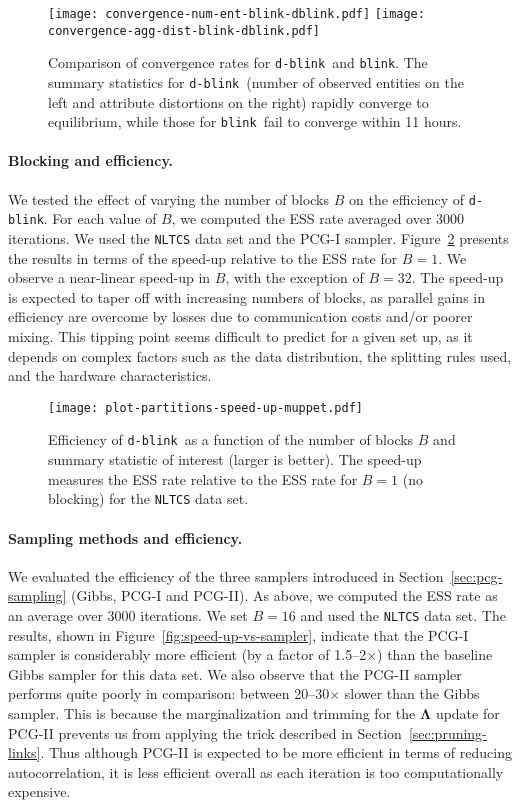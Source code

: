 \documentclass[12pt,letterpaper]{article}
\renewcommand\vec{\bm}
\newcommand{\1}[1]{\mathbb{I}\!\left[#1\right]} %
\newcommand{\dblink}{\texttt{\upshape \lowercase{d-blink}}} %
\newcommand{\blink}{\texttt{\upshape \lowercase{blink}}} %
\begin{document}
\begin{figure}[t]
  \centering
  \texttt{[image: convergence-num-ent-blink-dblink.pdf]} \quad
  \texttt{[image: convergence-agg-dist-blink-dblink.pdf]}
  \caption{Comparison of convergence rates for \dblink\ and 
  \blink. 
  The summary statistics for \dblink\ (number of observed entities 
  on the left and attribute distortions on the right) rapidly converge 
  to equilibrium, 
  while those for \blink\ fail to converge within 11 hours.}
  \label{fig:convergence-vs-impl}
\end{figure}

\paragraph{Blocking and efficiency.}
We tested the effect of varying the number of blocks $B$ on the efficiency 
of \dblink.
For each value of $B$, we computed the ESS rate 
averaged over 3000 iterations.
We used the \texttt{NLTCS} data set and the PCG-I sampler.
Figure~\ref{fig:speed-up-vs-num-partitions} presents the results in terms of 
the speed-up relative to the ESS rate for $B = 1$. 
We observe a near-linear speed-up in $B$, with the exception of $B=32$.
The speed-up is expected to taper off with increasing numbers of blocks, 
as parallel gains in efficiency are overcome by losses due to communication 
costs and\slash or poorer mixing.
This tipping point seems difficult to predict for a given set up, as it 
depends on complex factors such as the data distribution, the splitting rules 
used, and the hardware characteristics.

\begin{figure}[t]
  \centering
  \texttt{[image: plot-partitions-speed-up-muppet.pdf]}
  \caption{Efficiency of \dblink\ as a function of the
    number of blocks $B$ and summary statistic of interest 
    (larger is better).
    The speed-up measures the ESS rate relative to the ESS rate 
    for $B = 1$ (no blocking) for the \texttt{NLTCS} data set.}
  \label{fig:speed-up-vs-num-partitions}
\end{figure}

\paragraph{Sampling methods and efficiency.}
We evaluated the efficiency of the three samplers introduced in 
Section~\ref{sec:pcg-sampling} (Gibbs, PCG-I and PCG-II).
As above, we computed the ESS rate as an average over 3000 iterations.
We set $B = 16$ and used the \texttt{NLTCS} data set.
The results, shown in Figure~\ref{fig:speed-up-vs-sampler}, 
indicate that the PCG-I sampler is considerably more efficient (by a factor 
of 1.5--2$\times$) than the baseline Gibbs sampler for this data set.
We also observe that the PCG-II sampler performs quite poorly in comparison: 
between 20--30$\times$ slower than the Gibbs sampler.
This is because the marginalization and trimming for the $\vec{\Lambda}$ 
update for PCG-II prevents us from applying the trick described in 
Section~\ref{sec:pruning-links}.
Thus although PCG-II is expected to be more efficient in terms of 
reducing autocorrelation, it is less efficient overall as each iteration 
is too computationally expensive.
\end{document}
